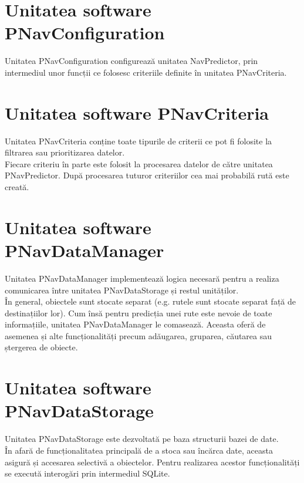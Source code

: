 \section{Unitatea software PNavConfiguration} 
Unitatea PNavConfiguration configurează unitatea NavPredictor, prin intermediul unor funcții ce folosesc criteriile definite în unitatea PNavCriteria.


\section{Unitatea software PNavCriteria} 
Unitatea PNavCriteria conține toate tipurile de criterii ce pot fi folosite la filtrarea sau prioritizarea datelor.
\vspace{6pt}
\\Fiecare criteriu în parte este folosit la procesarea datelor de către unitatea PNavPredictor.
După procesarea tuturor criteriilor cea mai probabilă rută este creată.


\section{Unitatea software PNavDataManager} 
Unitatea PNavDataManager implementează logica necesară pentru a realiza comunicarea între unitatea PNavDataStorage și restul unităților.
\vspace{6pt}
\\În general, obiectele sunt stocate separat (e.g. rutele sunt stocate separat față de destinațiilor lor). Cum însă pentru predicția unei rute este nevoie de toate informațiile, unitatea PNavDataManager le comasează. Aceasta oferă de asemenea și alte funcționalități precum adăugarea, gruparea, căutarea sau ștergerea de obiecte.


\section{Unitatea software PNavDataStorage} 
Unitatea PNavDataStorage este dezvoltată pe baza structurii bazei de date.
\vspace{6pt}
\\În afară de funcționalitatea principală de a stoca sau încărca date, aceasta asigură și accesarea selectivă a obiectelor. Pentru realizarea acestor funcționalități se execută interogări prin intermediul SQLite.
